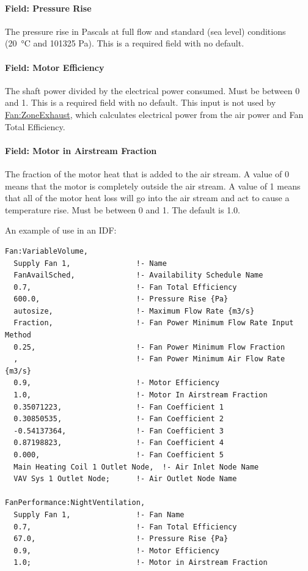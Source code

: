 \paragraph{Field: Pressure Rise}\label{field-pressure-rise-4}

The pressure rise in Pascals at full flow and standard (sea level) conditions (\SI{20}{\celsius} and 101325 Pa). This is a required field with no default.

\paragraph{Field: Motor Efficiency}\label{field-motor-efficiency-3}

The shaft power divided by the electrical power consumed. Must be between 0 and 1. This is a required field with no default. This input is not used by \hyperref[fanzoneexhaust]{Fan:ZoneExhaust}, which calculates electrical power from the air power and Fan Total Efficiency.

\paragraph{Field: Motor in Airstream Fraction}\label{field-motor-in-airstream-fraction-3}

The fraction of the motor heat that is added to the air stream. A value of 0 means that the motor is completely outside the air stream. A value of 1 means that all of the motor heat loss will go into the air stream and act to cause a temperature rise. Must be between 0 and 1. The default is 1.0.

An example of use in an IDF:

\begin{lstlisting}
Fan:VariableVolume,
  Supply Fan 1,               !- Name
  FanAvailSched,              !- Availability Schedule Name
  0.7,                        !- Fan Total Efficiency
  600.0,                      !- Pressure Rise {Pa}
  autosize,                   !- Maximum Flow Rate {m3/s}
  Fraction,                   !- Fan Power Minimum Flow Rate Input Method
  0.25,                       !- Fan Power Minimum Flow Fraction
  ,                           !- Fan Power Minimum Air Flow Rate {m3/s}
  0.9,                        !- Motor Efficiency
  1.0,                        !- Motor In Airstream Fraction
  0.35071223,                 !- Fan Coefficient 1
  0.30850535,                 !- Fan Coefficient 2
  -0.54137364,                !- Fan Coefficient 3
  0.87198823,                 !- Fan Coefficient 4
  0.000,                      !- Fan Coefficient 5
  Main Heating Coil 1 Outlet Node,  !- Air Inlet Node Name
  VAV Sys 1 Outlet Node;      !- Air Outlet Node Name

FanPerformance:NightVentilation,
  Supply Fan 1,               !- Fan Name
  0.7,                        !- Fan Total Efficiency
  67.0,                       !- Pressure Rise {Pa}
  0.9,                        !- Motor Efficiency
  1.0;                        !- Motor in Airstream Fraction
\end{lstlisting}

